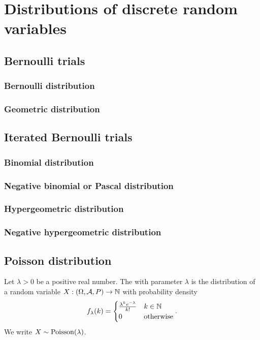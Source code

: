 \section{Distributions of discrete random variables}
\subsection{Bernoulli trials}
\subsubsection{Bernoulli distribution}
\subsubsection{Geometric distribution}

\subsection{Iterated Bernoulli trials}
\subsubsection{Binomial distribution}
\subsubsection{Negative binomial or Pascal distribution}
\subsubsection{Hypergeometric distribution}
\subsubsection{Negative hypergeometric distribution}

\subsection{Poisson distribution}
\begin{definition}
Let $\lambda > 0$ be a positive real number. The  with parameter $\lambda$ is the distribution of a random variable $X: \sSet{\Omega, \mathcal{A}, P} \to \N$ with probability density
\[ f_\lambda(k) = \begin{cases}
\frac{\lambda^k e^{-\lambda}}{k!} & k\in\mathbb{N} \\
0 & \text{otherwise}
\end{cases}. \]
We write $X \sim \operatorname{Poisson}(\lambda)$.
\end{definition}

